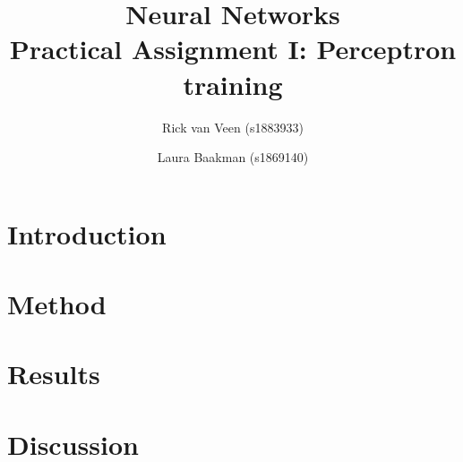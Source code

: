 \documentclass{article}
\title{Neural Networks\\Practical Assignment I: Perceptron training}
\author{Rick van Veen (s1883933) \and Laura Baakman (s1869140)}
\begin{document}
\maketitle

\section*{Introduction}

	
\section*{Method}
	

\section*{Results}


\section*{Discussion}

\end{document}
